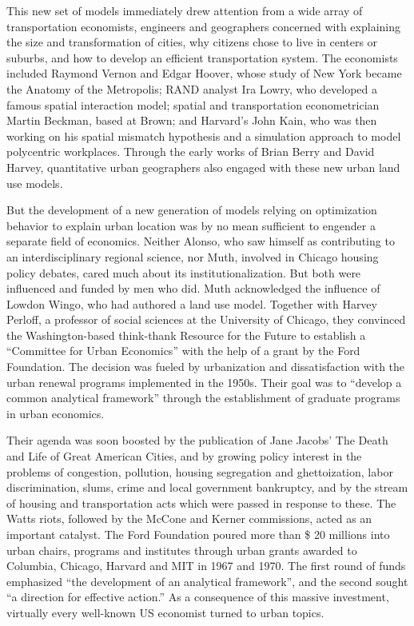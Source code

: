 \documentclass[
]{book}
\begin{document}
This new set of models immediately drew attention from a wide array of transportation economists, engineers and geographers concerned with explaining the size and transformation of cities, why citizens chose to live in centers or suburbs, and how to develop an efficient transportation system. The economists included Raymond Vernon and Edgar Hoover, whose study of New York became the Anatomy of the Metropolis; RAND analyst Ira Lowry, who developed a famous spatial interaction model; spatial and transportation econometrician Martin Beckman, based at Brown; and Harvard's John Kain, who was then working on his spatial mismatch hypothesis and a simulation approach to model polycentric workplaces. Through the early works of Brian Berry and David Harvey, quantitative urban geographers also engaged with these new urban land use models.

But the development of a new generation of models relying on optimization behavior to explain urban location was by no mean sufficient to engender a separate field of economics. Neither Alonso, who saw himself as contributing to an interdisciplinary regional science, nor Muth, involved in Chicago housing policy debates, cared much about its institutionalization. But both were influenced and funded by men who did. Muth acknowledged the influence of Lowdon Wingo, who had authored a land use model. Together with Harvey Perloff, a professor of social sciences at the University of Chicago, they convinced the Washington-based think-thank Resource for the Future to establish a ``Committee for Urban Economics'' with the help of a grant by the Ford Foundation. The decision was fueled by urbanization and dissatisfaction with the urban renewal programs implemented in the 1950s. Their goal was to ``develop a common analytical framework'' through the establishment of graduate programs in urban economics.

Their agenda was soon boosted by the publication of Jane Jacobs' The Death and Life of Great American Cities, and by growing policy interest in the problems of congestion, pollution, housing segregation and ghettoization, labor discrimination, slums, crime and local government bankruptcy, and by the stream of housing and transportation acts which were passed in response to these. The Watts riots, followed by the McCone and Kerner commissions, acted as an important catalyst. The Ford Foundation poured more than \$ 20 millions into urban chairs, programs and institutes through urban grants awarded to Columbia, Chicago, Harvard and MIT in 1967 and 1970. The first round of funds emphasized ``the development of an analytical framework'', and the second sought ``a direction for effective action.''
As a consequence of this massive investment, virtually every well-known US economist turned to urban topics.
\end{document}
